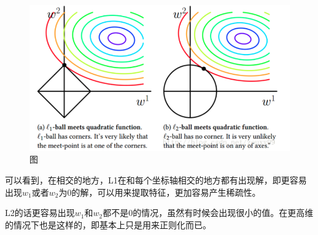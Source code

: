 	\begin{figure}[htbp]
	\centering\includegraphics[width=6in]{img/3-2.png}
	\caption{图}\label{fig:3-2}
	\end{figure}
	
	可以看到，在相交的地方，L1在和每个坐标轴相交的地方都有出现解，即更容易出现$w_1$或者$w_2$为0的解，可以用来提取特征，更加容易产生稀疏性。
	
	L2的话更容易出现$w_1$和$w_2$都不是0的情况，虽然有时候会出现很小的值。在更高维的情况下也是这样的，即基本上只是用来正则化而已。
	
	
	
	
	
	
	
	
	
	
	
	
	
	
	
	
	
	
	
